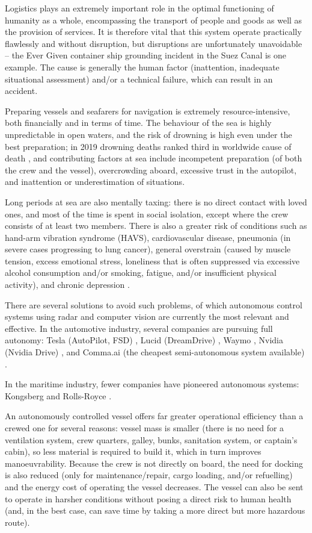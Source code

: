 
Logistics plays an extremely important role in the optimal functioning of humanity as a whole, encompassing the transport of people and goods as well as the provision of services. It is therefore vital that this system operate practically flawlessly and without disruption, but disruptions are unfortunately unavoidable -- the Ever Given container ship grounding incident in the Suez Canal \cite{ref1} is one example. The cause is generally the human factor (inattention, inadequate situational assessment) and/or a technical failure, which can result in an accident.

Preparing vessels and seafarers for navigation is extremely resource-intensive, both financially and in terms of time. The behaviour of the sea is highly unpredictable in open waters, and the risk of drowning is high even under the best preparation; in 2019 drowning deaths ranked third in worldwide cause of death \cite{ref2}, and contributing factors at sea include incompetent preparation (of both the crew and the vessel), overcrowding aboard, excessive trust in the autopilot, and inattention or underestimation of situations.

Long periods at sea are also mentally taxing: there is no direct contact with loved ones, and most of the time is spent in social isolation, except where the crew consists of at least two members. There is also a greater risk of conditions such as hand-arm vibration syndrome (HAVS), cardiovascular disease, pneumonia (in severe cases progressing to lung cancer), general overstrain (caused by muscle tension, excess emotional stress, loneliness that is often suppressed via excessive alcohol consumption and/or smoking, fatigue, and/or insufficient physical activity), and chronic depression \cite{ref3}.

There are several solutions to avoid such problems, of which autonomous control systems using radar and computer vision are currently the most relevant and effective. In the automotive industry, several companies are pursuing full autonomy: Tesla (AutoPilot, FSD) \cite{ref4}, Lucid (DreamDrive) \cite{ref5}, Waymo \cite{ref6}, Nvidia (Nvidia Drive) \cite{ref7}, and Comma.ai (the cheapest semi-autonomous system available) \cite{ref8}.

In the maritime industry, fewer companies have pioneered autonomous systems: Kongsberg \cite{ref9} and Rolls-Royce \cite{ref10}.

An autonomously controlled vessel offers far greater operational efficiency than a crewed one for several reasons: vessel mass is smaller (there is no need for a ventilation system, crew quarters, galley, bunks, sanitation system, or captain's cabin), so less material is required to build it, which in turn improves manoeuvrability. Because the crew is not directly on board, the need for docking is also reduced (only for maintenance/repair, cargo loading, and/or refuelling) and the energy cost of operating the vessel decreases. The vessel can also be sent to operate in harsher conditions without posing a direct risk to human health (and, in the best case, can save time by taking a more direct but more hazardous route).


